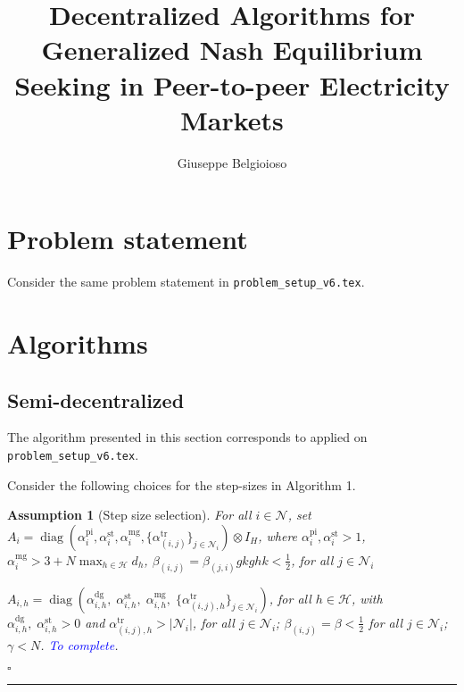 \documentclass[10pt]{article}
\title{Decentralized Algorithms for Generalized Nash Equilibrium Seeking in Peer-to-peer Electricity Markets}
\author{Giuseppe Belgioioso}
\newtheorem{assumption}{Assumption}{\it}{}
\newcommand{\mc}{\mathcal}
\newcommand{\blue}{\textcolor{blue}}
\newcommand{\diag}{\operatorname{diag}}
\newcommand{\0}{\mathbf{0}}
\newcommand{\1}{\mathbf{1}}
\begin{document}
\maketitle

\section{Problem statement}
Consider the same problem statement in \texttt{problem\_setup\_v6.tex}.


\section{Algorithms}
\subsection{Semi-decentralized}

The algorithm presented in this section corresponds to \cite[Alg. 6B]{belgioioso2020semi} applied on  \texttt{problem\_setup\_v6.tex}.

Consider the following choices for the step-sizes in Algorithm 1.
\smallskip

\begin{assumption}[Step size selection]\label{ass:SS-choice2}
For all $i \in \mc N$, set $A_i = \diag( \alpha_{i}^{\text{pi}}, \alpha_{i}^{\text{st}} , \alpha_{i}^{\text{mg}} , \{ \alpha_{(i,j)}^{\text{tr}} \}_{j \in \mc N_i} ) \otimes I_H$, where $\alpha_{i}^{\text{pi}}, \alpha_{i}^{\text{st}} > 1$, $ \alpha_{i}^{\text{mg}} > 3 + N \max_{h\in \mc H} d_h $, $\beta_{(i,j)} = \beta_{ (j,i)}gkghk < \frac{1}{2}$, for all $j \in \mc N_i$



$A_{i,h} = \diag \left(
\alpha_{i,h}^{\mathrm{dg}},  \; \alpha_{i,h}^{\mathrm{st}},\;  \alpha_{i,h}^{\mathrm{mg}}, \; \{ \alpha_{(i,j),h}^{\mathrm{tr}} \}_{j\in\mathcal{N}_i} \right)$, for all $ h \in \mc H$, with $\alpha_{i,h}^{\mathrm{dg}}, \; \alpha_{i,h}^{\mathrm{st}}>0$ and $\alpha_{(i,j),h}^{\mathrm{tr}} > |\mc N_i|$, for all $ j \in \mc N_i$; $\beta_{(i,j)} = \beta < \frac{1}{2}$ for all $j \in \mc N_i $; $\gamma < N$. \blue{To complete}.

{\hfill $\square$}
\end{assumption}

\newpage

\hrule
\end{document}
